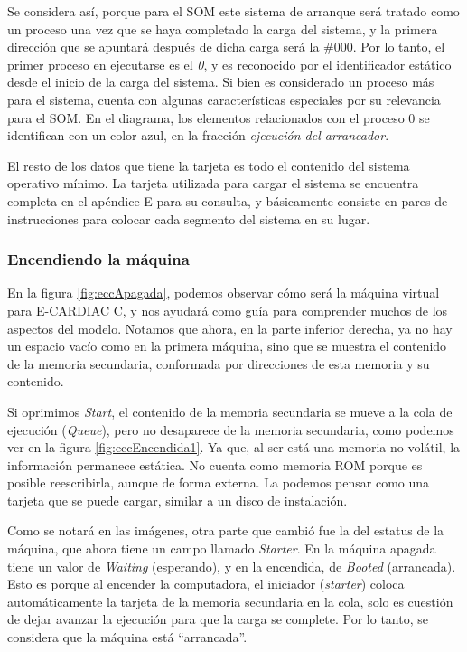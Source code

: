 \documentclass[letterpaper,12pt,oneside]{book}
\begin{document}
		Se considera así, porque para el SOM este sistema de arranque será tratado como un proceso una vez que se haya completado la carga
		del sistema, y la primera dirección que se apuntará después de dicha carga será la \#000. Por lo tanto, el primer proceso en
		ejecutarse es el \textit{0}, y es reconocido por el identificador estático desde el inicio de la carga del sistema.
	    Si bien es considerado un proceso más para el sistema, cuenta con algunas características especiales por su relevancia
	    para el SOM. En el diagrama, los elementos relacionados con el proceso 0 se identifican con un color azul, en la fracción  \textit{ejecución del 
	    arrancador}.
		
		El resto de los datos que tiene la tarjeta es todo el contenido  del sistema operativo mínimo. La tarjeta utilizada para cargar el sistema
		se encuentra completa en el apéndice E para su consulta, y básicamente consiste en pares de instrucciones para colocar cada segmento
		del sistema en su lugar.
		
		\subsubsection{Encendiendo la máquina}
		
		En la figura \ref{fig:eccApagada}, podemos observar  cómo será la máquina virtual para E-CARDIAC C, y nos ayudará como guía para comprender 
		muchos
		de los aspectos del modelo. Notamos que ahora, en la parte inferior derecha, ya no hay un espacio vacío como en la primera máquina, sino que se muestra
		el contenido de la memoria secundaria, conformada por direcciones de esta memoria y su contenido.
  
        Si oprimimos \textit{Start},
		el contenido de la memoria secundaria se mueve a la cola de ejecución (\textit{Queue}), pero no desaparece de la memoria secundaria, como podemos
		ver en la figura \ref{fig:eccEncendida1}. Ya que, al ser está una memoria no volátil, la información permanece estática. No cuenta como memoria 
		ROM porque es posible
		reescribirla, aunque de forma externa. La podemos pensar como una tarjeta que se puede cargar, similar
		a un disco de instalación.
  
        Como se notará en las imágenes, otra parte que cambió fue la del estatus de
		la máquina, que ahora tiene un campo llamado \textit{Starter}. En la máquina apagada tiene un valor de \textit{Waiting} (esperando), y 
		en la encendida, de \textit{Booted} (arrancada). Esto
		es porque al encender la computadora, el iniciador (\textit{starter}) coloca automáticamente la tarjeta de la memoria secundaria en la cola, 
		solo 
		es cuestión de dejar avanzar la ejecución para que la carga se complete. Por lo tanto, se considera que la máquina está ``arrancada''.
\end{document}
